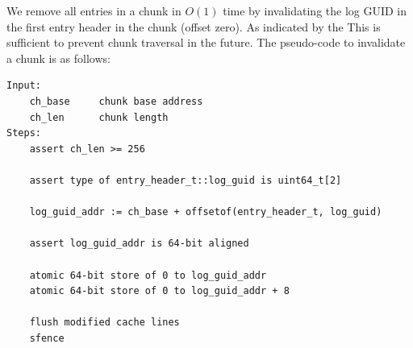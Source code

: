 \documentclass[12pt,a4paper,twoside]{book}
\begin{document}
We remove all entries in a chunk in $O(1)$ time by invalidating the log GUID in the first entry header in the chunk (offset zero).
As indicated by the This is sufficient to prevent chunk traversal in the future.
The pseudo-code to invalidate a chunk is as follows:

\begin{lstlisting}[style=figurepseudocode]
Input:
    ch_base     chunk base address
    ch_len      chunk length
Steps:
    assert ch_len >= 256

    assert type of entry_header_t::log_guid is uint64_t[2]

    log_guid_addr := ch_base + offsetof(entry_header_t, log_guid)

    assert log_guid_addr is 64-bit aligned

    atomic 64-bit store of 0 to log_guid_addr
    atomic 64-bit store of 0 to log_guid_addr + 8

    flush modified cache lines
    sfence
\end{lstlisting}
\end{document}
